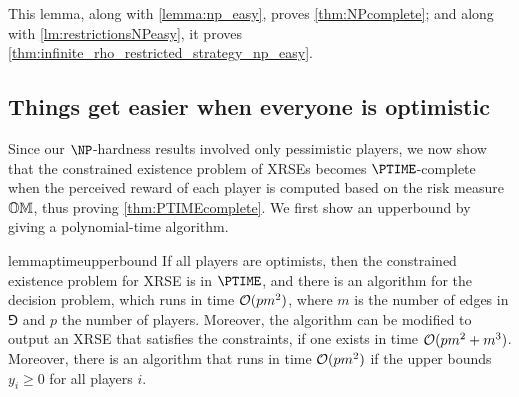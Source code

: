 
This lemma, along with \cref{lemma:np_easy}, proves \cref{thm:NPcomplete}; and along with \cref{lm:restrictionsNPeasy}, it proves \cref{thm:infinite_rho_restricted_strategy_np_easy}.




\subsection{Things get easier when everyone is optimistic}
Since our $\NP$-hardness results involved only pessimistic players, we now show that
the constrained existence problem of XRSEs becomes $\PTIME$-complete when the perceived reward of each player is computed based on the risk measure $\mathbb{OM}$, thus proving \cref{thm:PTIMEcomplete}.
We first show an upperbound by giving a polynomial-time algorithm.  

\begin{restatable}{lemma}{ptimeupperbound}\label{lm:ptimeupperbound}
    If all players are optimists, then the constrained existence problem for XRSE is in $\PTIME$, and there is an algorithm for the decision problem, which runs in time $\mathcal{O}(pm^2)$, where $m$ is the number of edges in $\Game$ and $p$ the number of players.
    Moreover, the algorithm can be modified to output an XRSE that satisfies the constraints, if one exists in time $\mathcal{O}(pm^2 + m^3)$.  Moreover, there is an algorithm that runs in time $\mathcal{O}(pm^2)$ if the upper bounds $y_i \geq 0$ for all players $i$.
\end{restatable}

